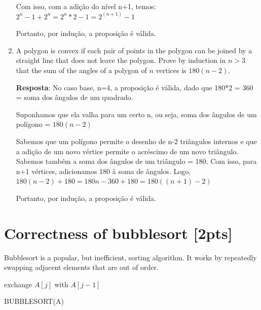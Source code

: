 \documentclass{article}
\begin{document}
\begin{enumerate}
		Com isso, com a adição do nível n+1, temos: $2^n-1 + 2^n = 2^n*2-1 = 2^{(n+1)}-1  $ 
		
		Portanto, por indução, a proposição é válida.
		
		\item A polygon is convex if each pair of points in the polygon can be joined by a straight line that does not leave the polygon. Prove by induction in $n>3$ that the sum of the angles of a polygon of $n$ vertices is $180(n-2)$.
		
		\textbf{Resposta}: No caso base, n=4, a proposição é válida, dado que 180*2 = 360 = soma dos ângulos de um quadrado.
		
		Suponhamos que ela valha para um certo n, ou seja, soma dos ângulos de um polígono = $180(n-2)$
		
		Sabemos que um polígono permite o desenho de n-2 triângulos internos e que a adição de um novo vértice permite o acréscimo de um novo triângulo. Sabemos também a soma dos ângulos de um triângulo = 180. Com isso, para n+1 vértices, adicionamos 180 à soma de ângulos. Logo, $180(n-2) + 180 = 180n - 360 + 180 = 180((n+1)-2)$
		
		Portanto, por indução, a proposição é válida.
		
	\end{enumerate}
	
	\section{Correctness of bubblesort [2pts]}
	Bubblesort is a popular, but inefficient, sorting algorithm. It works by repeatedly swapping adjacent elements that are out of order.
	
	\begin{algorithm}[H]
		\SetAlgoLined
		 {
			 {
				 {
					exchange $A[j]$ with $A[j-1]$
				}
			}
		}
		\caption{BUBBLESORT(A)}
	\end{algorithm}
	
\end{document}
